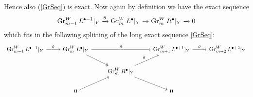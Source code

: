 \documentclass[../main.tex]{subfiles}
\begin{document}
Hence also (\ref{GrSeq}) is exact. Now again by definition we have the exact sequence
\begin{align*}
\operatorname{Gr}^W_{m-1} L^{\bullet-1}|_Y \xrightarrow{\theta}  \operatorname{Gr}^W_m L^{\bullet}|_Y \twoheadrightarrow  \operatorname{Gr}^W_m R^{\bullet}|_Y \xrightarrow{} 0 
\end{align*}
which fits in the following splitting of the long exact sequence \eqref{GrSeq}:
\begin{equation*}
\begin{tikzcd} 
   \Gr^W_{m-1} L^{\bullet-1}|_Y  \arrow[r, "\theta"]  & \Gr^W_{m} L^{\bullet}|_Y \arrow[rr, "\theta"] \arrow[dr,two heads]  & &  \Gr^W_{m+1} L^{\bullet+1}|_Y \arrow[r, "\theta"]  & \Gr^W_{m+2} L^{\bullet+2}|_Y \\
   &  & \Gr^W_m R^{\bullet}|_Y \ar[ur, "\theta"] \arrow[dr]  &  & \\
   & 0 \arrow[ur] & & 0 &
\end{tikzcd}   
\end{equation*}
\end{document}
